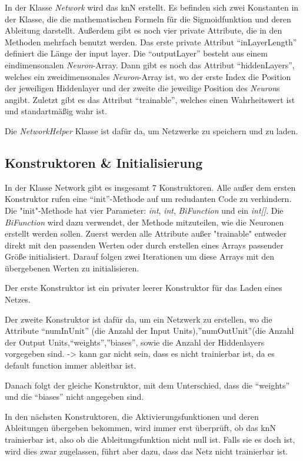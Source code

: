 \documentclass[paper=A4,pagesize=auto,12pt,headinclude=true,footinclude=true,BCOR=0mm,DIV=calc]{scrartcl}
\begin{document}
	In der Klasse \textit{Network} wird das knN erstellt.
	Es befinden sich zwei Konstanten in der Klasse, die die mathematischen Formeln für die Sigmoidfunktion und deren Ableitung darstellt. Außerdem gibt es noch vier private Attribute,  die in den Methoden mehrfach benutzt werden. Das erste private Attribut “inLayerLength” definiert die Länge der input layer. Die “outputLayer” besteht aus einem eindimensonalen \textit{Neuron}-Array. Dann gibt es noch das Attribut “hiddenLayers”, welches ein zweidimensonales \textit{Neuron}-Array ist, wo der erste Index die Position der jeweiligen Hiddenlayer und der zweite die jeweilige Position des \textit{Neuron}s angibt. Zuletzt gibt es das Attribut “trainable”, welches einen Wahrheitswert ist und standartmäßig wahr ist.
	
	Die \textit{NetworkHelper} Klasse ist dafür da, um Netzwerke zu speichern und zu laden.
	
	
	\subsection{Konstruktoren \& Initialisierung}
	In der Klasse Network gibt es insgesamt 7 Konstruktoren.
	Alle außer dem ersten Konstruktor rufen eine “init”-Methode auf um redudanten Code zu verhindern. Die "init"-Methode hat vier Parameter: \textit{int}, \textit{int}, \textit{BiFunction} und ein \textit{int[]}. Die \textit{BiFunction} wird dazu verwendet, der Methode mitzuteilen, wie die Neuronen erstellt werden sollen.
	Zuerst werden alle Attribute außer "trainable" entweder direkt mit den passenden Werten oder durch erstellen eines Arrays passender Größe initialisiert.
	Darauf folgen zwei Iterationen um diese Arrays mit den übergebenen Werten zu initialisieren.
	
	Der erste Konstruktor ist ein privater leerer Konstruktor für das Laden eines Netzes. 
	
	Der zweite Konstruktor ist dafür da, um ein Netzwerk zu erstellen, wo die Attribute “numInUnit” (die Anzahl der Input Units),”numOutUnit”(die Anzahl der Output Units,“weights”,”biases”, sowie die Anzahl der Hiddenlayers vorgegeben sind.
	-> kann gar nicht sein, dass es nicht trainierbar ist, da es default function immer ableitbar ist.
	
	Danach folgt der gleiche Konstruktor, mit dem Unterschied, dass die “weights” und die “biases” nicht angegeben sind.
	
	In den nächsten Konstruktoren, die Aktivierungsfunktionen und deren Ableitungen übergeben bekommen, wird immer erst überprüft, ob das knN trainierbar ist, also ob die Ableitungsfunktion nicht null ist. Falls sie es doch ist, wird dies zwar zugelassen, führt aber dazu, dass das Netz nicht trainierbar ist. 
	
\end{document}
